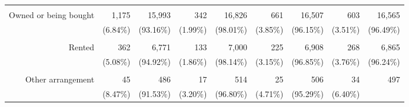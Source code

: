 \documentclass{article}
\begin{document}
\begin{tabular}{lllllllll}
  \multicolumn{1}{r}{} &
  \multicolumn{1}{r}{} \\
\multicolumn{1}{r}{Owned or being bought\hspace{1em}} &
  \multicolumn{1}{|r}{1,175} &
  \multicolumn{1}{r}{15,993} &
  \multicolumn{1}{r}{342} &
  \multicolumn{1}{r}{16,826} &
  \multicolumn{1}{r}{661} &
  \multicolumn{1}{r}{16,507} &
  \multicolumn{1}{r}{603} &
  \multicolumn{1}{r}{16,565} \\
\multicolumn{1}{r}{} &
  \multicolumn{1}{|r}{(6.84\%)} &
  \multicolumn{1}{r}{(93.16\%)} &
  \multicolumn{1}{r}{(1.99\%)} &
  \multicolumn{1}{r}{(98.01\%)} &
  \multicolumn{1}{r}{(3.85\%)} &
  \multicolumn{1}{r}{(96.15\%)} &
  \multicolumn{1}{r}{(3.51\%)} &
  \multicolumn{1}{r}{(96.49\%)} \\
\multicolumn{1}{r}{} &
  \multicolumn{1}{|r}{} &
  \multicolumn{1}{r}{} &
  \multicolumn{1}{r}{} &
  \multicolumn{1}{r}{} &
  \multicolumn{1}{r}{} &
  \multicolumn{1}{r}{} &
  \multicolumn{1}{r}{} &
  \multicolumn{1}{r}{} \\
\multicolumn{1}{r}{Rented\hspace{1em}} &
  \multicolumn{1}{|r}{362} &
  \multicolumn{1}{r}{6,771} &
  \multicolumn{1}{r}{133} &
  \multicolumn{1}{r}{7,000} &
  \multicolumn{1}{r}{225} &
  \multicolumn{1}{r}{6,908} &
  \multicolumn{1}{r}{268} &
  \multicolumn{1}{r}{6,865} \\
\multicolumn{1}{r}{} &
  \multicolumn{1}{|r}{(5.08\%)} &
  \multicolumn{1}{r}{(94.92\%)} &
  \multicolumn{1}{r}{(1.86\%)} &
  \multicolumn{1}{r}{(98.14\%)} &
  \multicolumn{1}{r}{(3.15\%)} &
  \multicolumn{1}{r}{(96.85\%)} &
  \multicolumn{1}{r}{(3.76\%)} &
  \multicolumn{1}{r}{(96.24\%)} \\
\multicolumn{1}{r}{} &
  \multicolumn{1}{|r}{} &
  \multicolumn{1}{r}{} &
  \multicolumn{1}{r}{} &
  \multicolumn{1}{r}{} &
  \multicolumn{1}{r}{} &
  \multicolumn{1}{r}{} &
  \multicolumn{1}{r}{} &
  \multicolumn{1}{r}{} \\
\multicolumn{1}{r}{Other arrangement\hspace{1em}} &
  \multicolumn{1}{|r}{45} &
  \multicolumn{1}{r}{486} &
  \multicolumn{1}{r}{17} &
  \multicolumn{1}{r}{514} &
  \multicolumn{1}{r}{25} &
  \multicolumn{1}{r}{506} &
  \multicolumn{1}{r}{34} &
  \multicolumn{1}{r}{497} \\
\multicolumn{1}{r}{} &
  \multicolumn{1}{|r}{(8.47\%)} &
  \multicolumn{1}{r}{(91.53\%)} &
  \multicolumn{1}{r}{(3.20\%)} &
  \multicolumn{1}{r}{(96.80\%)} &
  \multicolumn{1}{r}{(4.71\%)} &
  \multicolumn{1}{r}{(95.29\%)} &
  \multicolumn{1}{r}{(6.40\%)} &

\end{tabular}
\end{document}
